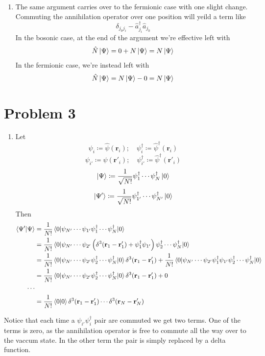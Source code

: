 \documentclass[12pt]{article}
\begin{document}
\begin{enumerate}[label=(\alph*)]
    \item The same argument carries over to the fermionic case with one slight change. Commuting the annihilation operator over one position will yeild a term like
    \[ \delta_{j_0j_i} - \hat{a}_{j_i}^\dag\hat{a}_{j_0} \]
    In the bosonic case, at the end of the argument we're effective left with 
    \[ \hat{N}\ket{\Psi} = 0 + N\ket{\Psi} = N\ket{\Psi} \]
    In the fermionic case, we're instead left with
    \[ \hat{N}\ket{\Psi} = N\ket{\Psi} - 0 = N\ket{\Psi} \]

\end{enumerate}


\section*{Problem 3}
\begin{enumerate}[label=(\alph*)]
    \item Let
    \[ \psi_i \coloneqq \hat{\psi}(\mathbf{r}_i); \quad \psi_i^\dag \coloneqq \hat{\psi}^\dag(\mathbf{r}_i) \]
    \[ \psi_{i'} \coloneqq \hat{\psi}(\mathbf{r}'_i); \quad \psi_{i'}^\dag \coloneqq \hat{\psi}^\dag(\mathbf{r}'_i) \]
    \[ \ket{\Psi} \coloneqq \frac{1}{\sqrt{N!}}\psi_1^\dag\cdots\psi_N^\dag\ket{0} \]
    \[ \ket{\Psi'} \coloneqq \frac{1}{\sqrt{N!}}\psi_{1'}^\dag\cdots\psi_{N'}^\dag\ket{0} \]
    Then
    \begin{align*}
        \braket{\Psi'}{\Psi} &= \frac{1}{N!}\mel{0}{\psi_{N'}\cdots\psi_{1'}\psi_1^\dag\cdots\psi_N^\dag}{0} \\
        &= \frac{1}{N!}\mel{0}{\psi_{N'}\cdots\psi_{2'}\left(\delta^3(\mathbf{r}_1 - \mathbf{r}'_1) + \psi_1^\dag\psi_{1'}\right)\psi_2^\dag\cdots\psi_N^\dag}{0} \\
        &= \frac{1}{N!}\mel{0}{\psi_{N'}\cdots\psi_{2'}\psi_2^\dag\cdots\psi_N^\dag}{0}\delta^3(\mathbf{r}_1 - \mathbf{r}'_1) + \frac{1}{N!}\mel{0}{\psi_{N'}\cdots\psi_{2'}\psi_1^\dag\psi_{1'}\psi_{2}^\dag\cdots\psi_N^\dag}{0} \\
        &= \frac{1}{N!}\mel{0}{\psi_{N'}\cdots\psi_{2'}\psi_2^\dag\cdots\psi_N^\dag}{0}\delta^3(\mathbf{r}_1 - \mathbf{r}'_1) + 0 \\
        \cdots \\
        &= \frac{1}{N!}\braket{0}\delta^3(\mathbf{r}_1 - \mathbf{r}'_1) \cdots \delta^3(\mathbf{r}_N - \mathbf{r}'_N)
    \end{align*}
\end{enumerate}
Notice that each time a $\psi_{i'}\psi_i^\dag$ pair are commuted we get two terms. One of the terms is zero, as the annihilation operator is free to commute all the way over to the vaccum state. In the other term the pair is simply replaced by a delta function.
\end{document}

